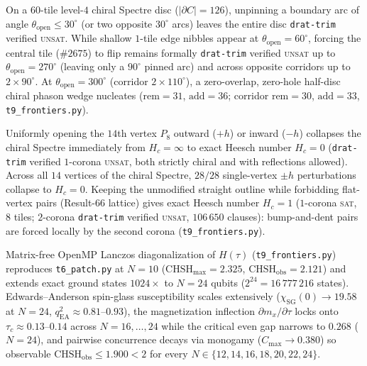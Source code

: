 
\begin{result}[\exact]\label{res:holographic-wedge}
On a $60$-tile level-$4$ chiral Spectre disc ($|\partial C|=126$), unpinning a boundary arc of angle $\theta_{\mathrm{open}}\le30^\circ$ (or two opposite $30^\circ$ arcs) leaves the entire disc \texttt{drat-trim} verified \textsc{unsat}. While shallow $1$-tile edge nibbles appear at $\theta_{\mathrm{open}}=60^\circ$, forcing the central tile ($\#2675$) to flip remains formally \texttt{drat-trim} verified \textsc{unsat} up to $\theta_{\mathrm{open}}=270^\circ$ (leaving only a $90^\circ$ pinned arc) and across opposite corridors up to $2\times90^\circ$. At $\theta_{\mathrm{open}}=300^\circ$ (corridor $2\times110^\circ$), a zero-overlap, zero-hole half-disc chiral phason wedge nucleates ($\mathrm{rem}=31$, $\mathrm{add}=36$; corridor $\mathrm{rem}=30$, $\mathrm{add}=33$, \texttt{t9\_frontiers.py}).
\end{result}

\begin{result}[\exact]\label{res:heesch-collapse}
Uniformly opening the $14$th vertex $P_8$ outward ($+h$) or inward ($-h$) collapses the chiral Spectre immediately from $H_c=\infty$ to exact Heesch number $H_c=0$ (\texttt{drat-trim} verified $1$-corona \textsc{unsat}, both strictly chiral and with reflections allowed). Across all $14$ vertices of the chiral Spectre, $28/28$ single-vertex $\pm h$ perturbations collapse to $H_c=0$. Keeping the unmodified straight outline while forbidding flat-vertex pairs (Result-$66$ lattice) gives exact Heesch number $H_c=1$ ($1$-corona \textsc{sat}, $8$ tiles; $2$-corona \texttt{drat-trim} verified \textsc{unsat}, $106\,650$ clauses): bump-and-dent pairs are forced locally by the second corona (\texttt{t9\_frontiers.py}).
\end{result}

\begin{result}[\exact\ finite-$N$ ED to $N=24$; \negative\ for macroscopic pairwise Bell violation]\label{res:lanczos-n24}
Matrix-free OpenMP Lanczos diagonalization of $H(\tau)$ (\texttt{t9\_frontiers.py}) reproduces \texttt{t6\_patch.py} at $N=10$ ($\mathrm{CHSH}_{\max}=2.325$, $\mathrm{CHSH}_{\mathrm{obs}}=2.121$) and extends exact ground states $1024\times$ to $N=24$ qubits ($2^{24}=16\,777\,216$ states). Edwards--Anderson spin-glass susceptibility scales extensively ($\chi_{\mathrm{SG}}(0)\to19.58$ at $N=24$, $q_{\mathrm{EA}}^2\approx0.81$--$0.93$), the magnetization inflection $\partial m_x/\partial\tau$ locks onto $\tau_c\approx0.13$--$0.14$ across $N=16,\dots,24$ while the critical even gap narrows to $0.268$ ($N=24$), and pairwise concurrence decays via monogamy ($C_{\max}\to0.380$) so observable $\mathrm{CHSH}_{\mathrm{obs}}\le1.900<2$ for every $N\in\{12,14,16,18,20,22,24\}$.
\end{result}

